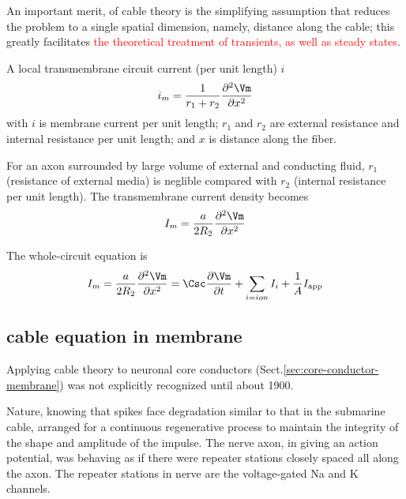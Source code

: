 An important merit, of cable theory is the simplifying assumption that reduces
the problem to a single spatial dimension, namely, distance along the cable;
this greatly facilitates \textcolor{red}{the theoretical treatment of
transients, as well as steady states}.


A local transmembrane circuit current (per unit length) $i$
\begin{equation}
i_m = \frac{1}{r_1 + r_2} \frac{\partial^2 \Vm}{\partial x^2}
\end{equation}
with $i$ is membrane current per unit length; $r_1$ and $r_2$ are
external resistance and internal resistance per unit length; and $x$ is distance
along the fiber. 

For an axon surrounded by large volume of external and conducting fluid, $r_1$
(resistance of external media) is neglible compared with $r_2$
(internal resistance per unit length). The transmembrane current density becomes
\begin{equation}
I_m = \frac{a}{2 R_2	 } \frac{\partial^2 \Vm}{\partial x^2}
\end{equation}


The whole-circuit equation is
\begin{equation}
I_m = \frac{a}{2 R_2	 } \frac{\partial^2 \Vm}{\partial x^2}
  = \Csc \frac{\partial \Vm}{\partial t} + \sum_{i=ion} I_i +
  \frac{1}{A}I_{\text{app}}
\end{equation}


\subsection{cable equation in membrane}

Applying cable theory to neuronal core conductors
(Sect.\ref{sec:core-conductor-membrane}) was not explicitly recognized until
about 1900.

Nature, knowing that spikes face degradation similar to that in the submarine
cable, arranged for a continuous regenerative process to maintain the integrity
of the shape and amplitude of the impulse. 
The nerve axon, in giving an action potential, was behaving as if there were
repeater stations closely spaced all along the axon. The repeater stations in
nerve are the voltage-gated Na and K channels.

